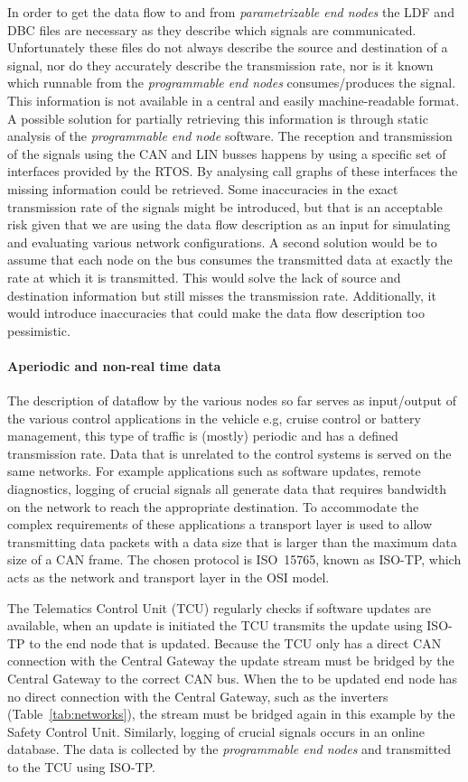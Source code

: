 In order to get the data flow to and from \textit{parametrizable end nodes} the LDF and DBC files are necessary as they describe which signals are communicated. Unfortunately these files do not always describe the source and destination of a signal, nor do they accurately describe the transmission rate, nor is it known which runnable from the \textit{programmable end nodes} consumes/produces the signal. This information is not available in a central and easily machine-readable format. A possible solution for partially retrieving this information is through static analysis of the \textit{programmable end node} software. The reception and transmission of the signals using the CAN and LIN busses happens by using a specific set of interfaces provided by the RTOS. By analysing call graphs of these interfaces the missing information could be retrieved. Some inaccuracies in the exact transmission rate of the signals might be introduced, but that is an acceptable risk given that we are using the data flow description as an input for simulating and evaluating various network configurations. A second solution would be to assume that each node on the bus consumes the transmitted data at exactly the rate at which it is transmitted. This would solve the lack of source and destination information but still misses the transmission rate. Additionally, it would introduce inaccuracies that could make the data flow description too pessimistic.

\paragraph{Aperiodic and non-real time data}
The description of dataflow by the various nodes so far serves as input/output of the various control applications in the vehicle e.g, cruise control or battery management, this type of traffic is (mostly) periodic and has a defined transmission rate. Data that is unrelated to the control systems is served on the same networks. For example applications such as software updates, remote diagnostics, logging of crucial signals all generate data that requires bandwidth on the network to reach the appropriate destination. To accommodate the complex requirements of these applications a transport layer is used to allow transmitting data packets with a data size that is larger than the maximum data size of a CAN frame. The chosen protocol is ISO~15765, known as ISO-TP, which acts as the network and transport layer in the OSI model.

The Telematics Control Unit (TCU) regularly checks if software updates are available, when an update is initiated the TCU transmits the update using ISO-TP to the end node that is updated. Because the TCU only has a direct CAN connection with the Central Gateway the update stream must be bridged by the Central Gateway to the correct CAN bus. When the to be updated end node has no direct connection with the Central Gateway, such as the inverters (Table~\ref{tab:networks}), the stream must be bridged again in this example by the Safety Control Unit. Similarly, logging of crucial signals occurs in an online database. The data is collected by the \textit{programmable end nodes} and transmitted to the TCU using ISO-TP. 

